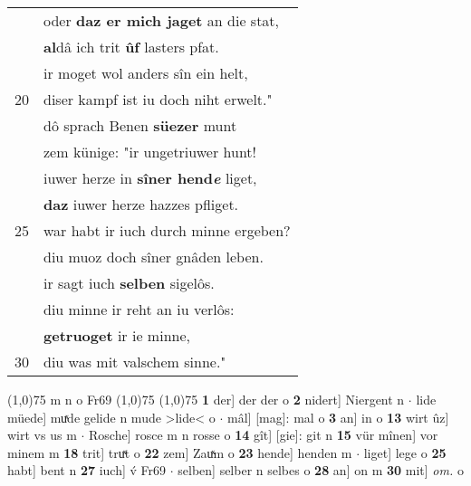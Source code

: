 \documentclass[8pt,a4paper,notitlepage]{article}
\begin{document}
\begin{table}[ht]
\begin{minipage}[t]{0.5\linewidth}
\begin{tabular}{rl}
 & oder \textbf{daz er mich jaget} an die stat,\\ 
 & \textbf{al}dâ ich trit \textbf{ûf} lasters pfat.\\ 
 & ir moget wol anders sîn ein helt,\\ 
20 & diser kampf ist iu doch niht erwelt."\\ 
 & dô sprach Benen \textbf{süezer} munt\\ 
 & zem künige: "ir ungetriuwer hunt!\\ 
 & iuwer herze in \textbf{sîner hend\textit{e}} liget,\\ 
 & \textbf{daz} iuwer herze hazzes pfliget.\\ 
25 & war habt ir iuch durch minne ergeben?\\ 
 & diu muoz doch sîner gnâden leben.\\ 
 & ir sagt iuch \textbf{selben} sigelôs.\\ 
 & diu minne ir reht an iu verlôs:\\ 
 & \textbf{getruoget} ir ie minne,\\ 
30 & diu was mit valschem sinne."\\ 
\end{tabular}
\scriptsize
\line(1,0){75} \newline
m n o Fr69 \newline
\line(1,0){75} \newline
\newline
\line(1,0){75} \newline
\textbf{1} der] der der o \textbf{2} nidert] Niergent n  $\cdot$ lide müede] muͯde gelide n mude >lide< o  $\cdot$ mâl] [mag]: mal o \textbf{3} an] in o \textbf{13} wirt ûz] wirt vs us m  $\cdot$ Rosche] rosce m n rosse o \textbf{14} gît] [gie]: git n \textbf{15} vür mînen] vor minem m \textbf{18} trit] truͯt o \textbf{22} zem] Zauͯm o \textbf{23} hende] henden m  $\cdot$ liget] lege o \textbf{25} habt] bent n \textbf{27} iuch] v́ Fr69  $\cdot$ selben] selber n selbes o \textbf{28} an] on m \textbf{30} mit] \textit{om.} o \newline
\end{minipage}
\end{table}
\newpage
\end{document}
